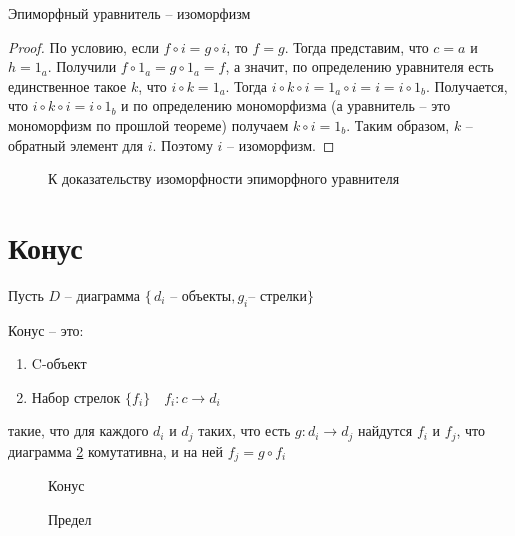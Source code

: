 \begin{thm}
  Эпиморфный уравнитель -- изоморфизм
\end{thm}
\begin{proof}
  По условию, если $f \circ i = g \circ i$, то $f = g$.
  Тогда представим, что $c = a$ и $h = 1_a$.
  Получили $f \circ 1_a = g \circ 1_a = f$, а значит,
  по определению уравнителя есть единственное такое $k$, что $i \circ k = 1_a$.
  Тогда $i \circ k \circ i = 1_a \circ i = i = i \circ 1_b$.
  Получается, что $i \circ k \circ i = i \circ 1_b$ и по определению мономорфизма
  (а уравнитель -- это мономорфизм по прошлой теореме) получаем $k \circ i = 1_b$.
  Таким образом, $k$ -- обратный элемент для $i$.
  Поэтому $i$ -- изоморфизм.
\end{proof}
\begin{figure}[h]
  \centering
  \caption{К доказательству изоморфности эпиморфного уравнителя}
  \label{fig:equaliser-isomorphism}
\end{figure}

\section{Конус}
Пусть $D$ -- диаграмма $\{\,d_i \text{ -- объекты}, g_i \text{-- стрелки}\}$
\begin{defn}
  Конус -- это:
  \begin{enumerate}
  \item C-объект
  \item Набор стрелок $\{f_i\} \quad f_i \colon c \to d_i$
  \end{enumerate}
  такие, что для каждого $d_i$ и $d_j$ таких, что есть $g\colon d_i \to d_j$
  найдутся $f_i$ и $f_j$, что диаграмма \ref{fig:cone} комутативна, и на ней
  $f_j = g \circ f_i$
\end{defn}

\begin{figure}[h]
  \centering
  \caption{Конус}
  \label{fig:cone}
\end{figure}

\begin{figure}[h]
  \centering
  \caption{Предел}
  \label{fig:limit}
\end{figure}
